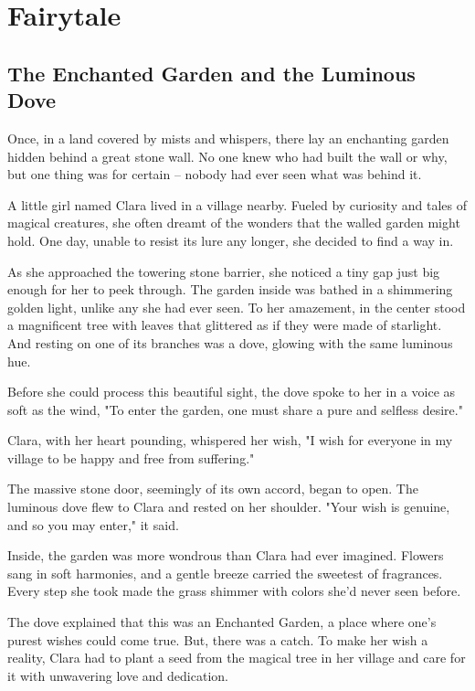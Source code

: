 \documentclass[10pt, a4paper, titlepage]{article}
\begin{document}
\newpage
\section{Fairytale}
\subsection*{The Enchanted Garden and the Luminous Dove}

Once, in a land covered by mists and whispers, there lay an enchanting garden hidden behind a great stone wall. No one knew who had built the wall or why, but one thing was for certain – nobody had ever seen what was behind it.

A little girl named Clara lived in a village nearby. Fueled by curiosity and tales of magical creatures, she often dreamt of the wonders that the walled garden might hold. One day, unable to resist its lure any longer, she decided to find a way in.

As she approached the towering stone barrier, she noticed a tiny gap just big enough for her to peek through. The garden inside was bathed in a shimmering golden light, unlike any she had ever seen. To her amazement, in the center stood a magnificent tree with leaves that glittered as if they were made of starlight. And resting on one of its branches was a dove, glowing with the same luminous hue.

Before she could process this beautiful sight, the dove spoke to her in a voice as soft as the wind, "To enter the garden, one must share a pure and selfless desire."

Clara, with her heart pounding, whispered her wish, "I wish for everyone in my village to be happy and free from suffering."

The massive stone door, seemingly of its own accord, began to open. The luminous dove flew to Clara and rested on her shoulder. "Your wish is genuine, and so you may enter," it said.

Inside, the garden was more wondrous than Clara had ever imagined. Flowers sang in soft harmonies, and a gentle breeze carried the sweetest of fragrances. Every step she took made the grass shimmer with colors she'd never seen before.

The dove explained that this was an Enchanted Garden, a place where one’s purest wishes could come true. But, there was a catch. To make her wish a reality, Clara had to plant a seed from the magical tree in her village and care for it with unwavering love and dedication.
\end{document}
